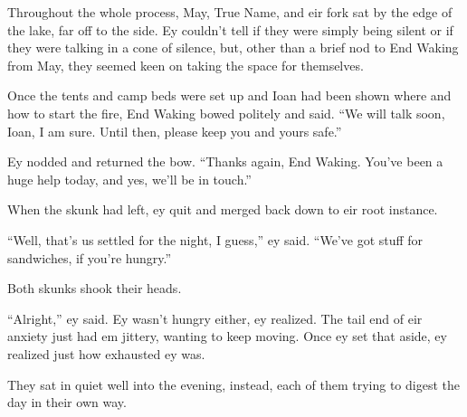 Throughout the whole process, May, True Name, and eir fork sat by the edge of the lake, far off to the side. Ey couldn't tell if they were simply being silent or if they were talking in a cone of silence, but, other than a brief nod to End Waking from May, they seemed keen on taking the space for themselves.

Once the tents and camp beds were set up and Ioan had been shown where and how to start the fire, End Waking bowed politely and said. ``We will talk soon, Ioan, I am sure. Until then, please keep you and yours safe.''

Ey nodded and returned the bow. ``Thanks again, End Waking. You've been a huge help today, and yes, we'll be in touch.''

When the skunk had left, ey quit and merged back down to eir root instance.

``Well, that's us settled for the night, I guess,'' ey said. ``We've got stuff for sandwiches, if you're hungry.''

Both skunks shook their heads.

``Alright,'' ey said. Ey wasn't hungry either, ey realized. The tail end of eir anxiety just had em jittery, wanting to keep moving. Once ey set that aside, ey realized just how exhausted ey was.

They sat in quiet well into the evening, instead, each of them trying to digest the day in their own way.
